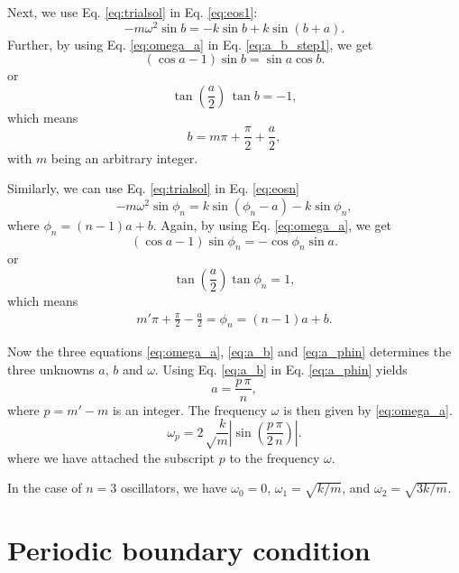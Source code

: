 \documentclass[12pt]{article}
\begin{document}
Next, we use Eq. \eqref{eq:trialsol} in Eq. \eqref{eq:eos1}:
\begin{equation}
-m \omega^2 \sin b
=
-k \sin b
+k \sin(b + a).
\label{eq:a_b_step1}
\end{equation}
Further, by using Eq. \eqref{eq:omega_a} in Eq. \eqref{eq:a_b_step1},
we get
\begin{equation*}
(\cos a - 1) \sin b
= \sin a \cos b.
\end{equation*}
or
\begin{equation*}
\tan \left( \frac a 2 \right) \, \tan b
= -1,
\end{equation*}
which means
\begin{equation}
b = m \pi + \frac \pi 2 + \frac a 2,
\label{eq:a_b}
\end{equation}
with $m$ being an arbitrary integer.



Similarly, we can use Eq. \eqref{eq:trialsol} in Eq. \eqref{eq:eosn}
\begin{equation*}
-m \omega^2 \sin \phi_n
=
k \sin(\phi_n - a)
-k \sin \phi_n,
\end{equation*}
where $\phi_n = (n - 1) a + b$.
%
Again, by using Eq. \eqref{eq:omega_a}, we get
\[
(\cos a - 1) \sin \phi_n
= - \cos \phi_n \sin a.
\]
or
\[
\tan \left( \frac a  2 \right) \tan \phi_n = 1,
\]
which means
\begin{align}
m' \pi + \frac \pi 2 - \frac a 2 = \phi_n = (n - 1) a + b.
\label{eq:a_phin}
\end{align}


Now the three equations \eqref{eq:omega_a}, \eqref{eq:a_b} and \eqref{eq:a_phin}
determines the three unknowns $a$, $b$ and $\omega$.
%
Using Eq. \eqref{eq:a_b} in Eq. \eqref{eq:a_phin} yields
\begin{equation*}
a = \frac{ p \, \pi } { n},
\end{equation*}
where $p = m' - m$ is an integer.
%
The frequency $\omega$ is then given by \eqref{eq:omega_a}.
\begin{equation}
\omega_p
=
2 \sqrt \frac k m
\left|
\sin \left( \frac {p \, \pi} {2 \, n} \right)
\right|.
\label{eq:freq}
\end{equation}
where we have attached the subscript $p$ to the frequency $\omega$.

In the case of $n = 3$ oscillators, we have
$\omega_0 = 0$,
$\omega_1 = \sqrt{k/m}$,
and
$\omega_2 = \sqrt{3k/m}$.




\section{Periodic boundary condition}
\end{document}
